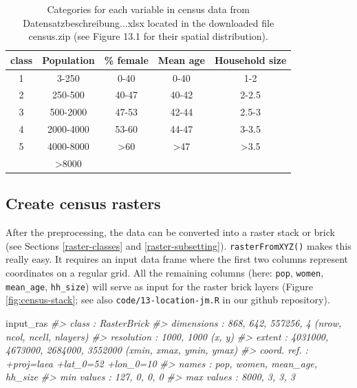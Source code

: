 \documentclass[]{krantz}
\newenvironment{Shaded}{\begin{snugshade}}{\end{snugshade}}
\newcommand{\CommentTok}[1]{\textcolor[rgb]{0.37,0.37,0.37}{\textit{#1}}}
\newcommand{\DataTypeTok}[1]{\textcolor[rgb]{0.27,0.27,0.27}{#1}}
\newcommand{\DecValTok}[1]{\textcolor[rgb]{0.06,0.06,0.06}{#1}}
\newcommand{\KeywordTok}[1]{\textcolor[rgb]{0.27,0.27,0.27}{\textbf{#1}}}
\newcommand{\NormalTok}[1]{#1}
\newcommand{\OperatorTok}[1]{\textcolor[rgb]{0.43,0.43,0.43}{\textbf{#1}}}
\newcommand{\StringTok}[1]{\textcolor[rgb]{0.5,0.5,0.5}{#1}}
\begin{document}
\begin{table}[t]

\caption[Categories for each variable in census data.]{\label{tab:census-desc}Categories for each variable in census data from Datensatzbeschreibung...xlsx located in the downloaded file census.zip (see Figure 13.1 for their spatial distribution).}
\centering
\begin{tabular}{ccccc}
\toprule
class & Population & \% female & Mean age & Household size\\
\midrule
1 & 3-250 & 0-40 & 0-40 & 1-2\\
2 & 250-500 & 40-47 & 40-42 & 2-2.5\\
3 & 500-2000 & 47-53 & 42-44 & 2.5-3\\
4 & 2000-4000 & 53-60 & 44-47 & 3-3.5\\
5 & 4000-8000 & >60 & >47 & >3.5\\
\addlinespace
6 & >8000 &  &  & \\
\bottomrule
\end{tabular}
\end{table}

\hypertarget{create-census-rasters}{%
\subsection{Create census rasters}\label{create-census-rasters}}

After the preprocessing, the data can be converted into a raster stack or brick (see Sections \ref{raster-classes} and \ref{raster-subsetting}).
\texttt{rasterFromXYZ()} makes this really easy.
It requires an input data frame where the first two columns represent coordinates on a regular grid.
All the remaining columns (here: \texttt{pop}, \texttt{women}, \texttt{mean\_age}, \texttt{hh\_size}) will serve as input for the raster brick layers (Figure \ref{fig:census-stack}; see also \texttt{code/13-location-jm.R} in our github repository).

\begin{Shaded}
\end{Shaded}

\begin{Shaded}
\begin{Highlighting}[]
\NormalTok{input_ras}
\CommentTok{#> class : RasterBrick}
\CommentTok{#> dimensions : 868, 642, 557256, 4 (nrow, ncol, ncell, nlayers)}
\CommentTok{#> resolution : 1000, 1000 (x, y)}
\CommentTok{#> extent : 4031000, 4673000, 2684000, 3552000 (xmin, xmax, ymin, ymax)}
\CommentTok{#> coord. ref. : +proj=laea +lat_0=52 +lon_0=10}
\CommentTok{#> names       :  pop, women, mean_age, hh_size }
\CommentTok{#> min values  :  127,     0,        0,       0 }
\CommentTok{#> max values  : 8000,     3,        3,       3 }
\end{Highlighting}
\end{Shaded}
\end{document}
